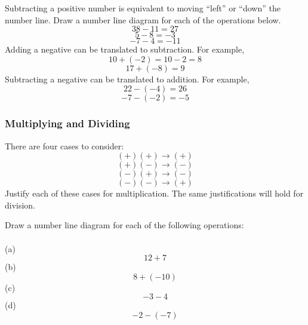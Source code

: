 Subtracting a positive number is equivalent to moving ``left'' or ``down'' the number line. 
Draw a number line diagram for each of the operations below. 
\[ 38 - 11 = 27 \]
\[  5-8 = -3  \]
\[  -7 - 4 = -11   \]
Adding a negative can be translated to subtraction.  For example, 
\[10 + (-2) = 10 -2 = 8 \]
\[  17 + (-8) = 9 \]
Subtracting a negative can be translated to addition.  For example, 
\[  22 - (-4) = 26 \]
\[ -7 - (-2) = -5 \]

\subsubsection{Multiplying and Dividing} 
There are four cases to consider: 
\[ (+)(+) \to (+)  \]
\[ (+)(-) \to (-)  \]
\[ (-)(+) \to (-)  \]
\[ (-)(-) \to (+)  \]
Justify each of these cases for multiplication.  The same justifications will hold for division.  

\newpage 

\begin{exercise}
	Draw a number line diagram for each of the following operations:   \\ \\
(a)	\[  12 + 7  \]    
(b)	\[  8 + (-10) \]  
(c)	\[  -3 - 4  \]
(d)	\[  -2 - (-7)    \]

\end{exercise}


\newpage 
